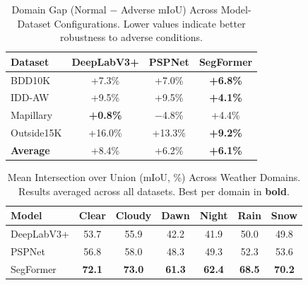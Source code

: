 \begin{table}[t]
\centering
\caption{Domain Gap (Normal $-$ Adverse mIoU) Across Model-Dataset Configurations. Lower values indicate better robustness to adverse conditions.}
\label{tab:domain_gap}
\begin{tabular}{@{}lccc@{}}
\toprule
\textbf{Dataset} & \textbf{DeepLabV3+} & \textbf{PSPNet} & \textbf{SegFormer} \\
\midrule
BDD10K      & +7.3\% & +7.0\% & \textbf{+6.8\%} \\
IDD-AW      & +9.5\% & +9.5\% & \textbf{+4.1\%} \\
Mapillary   & \textbf{+0.8\%} & $-$4.8\% & +4.4\% \\
Outside15K  & +16.0\% & +13.3\% & \textbf{+9.2\%} \\
\midrule
\textbf{Average} & +8.4\% & +6.2\% & \textbf{+6.1\%} \\
\bottomrule
\end{tabular}
\end{table}



\begin{table}[t]
\centering
\caption{Mean Intersection over Union (mIoU, \%) Across Weather Domains. Results averaged across all datasets. Best per domain in \textbf{bold}.}
\label{tab:domain_performance}
\begin{tabular}{@{}lcccccc@{}}
\toprule
\textbf{Model} & \textbf{Clear} & \textbf{Cloudy} & \textbf{Dawn} & \textbf{Night} & \textbf{Rain} & \textbf{Snow} \\
\midrule
DeepLabV3+ & 53.7 & 55.9 & 42.2 & 41.9 & 50.0 & 49.8 \\
PSPNet     & 56.8 & 58.0 & 48.3 & 49.3 & 52.3 & 53.6 \\
SegFormer  & \textbf{72.1} & \textbf{73.0} & \textbf{61.3} & \textbf{62.4} & \textbf{68.5} & \textbf{70.2} \\
\bottomrule
\end{tabular}
\end{table}



